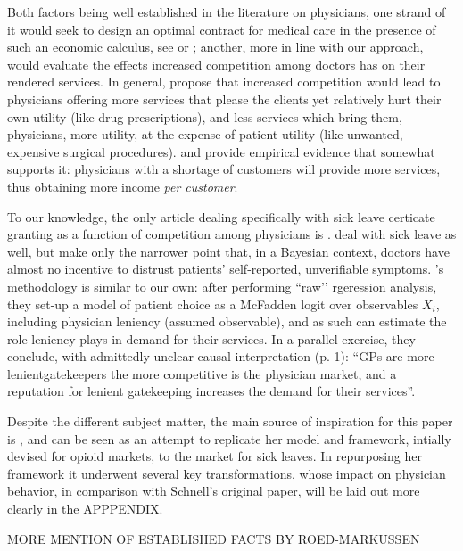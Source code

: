 \documentclass[../main.tex]{subfiles}
\begin{document}
Both factors being well established in the literature on physicians, one strand of it would seek to design an optimal contract for medical care in the presence of such an economic calculus, see \cite{chone-ma} or \cite{optimal-altruism}; another, more in line with our approach, would evaluate the effects increased competition among doctors has on their rendered services. In general, \cite{currie2023effects} propose that increased competition would lead to physicians offering more services that please the clients yet relatively hurt their own utility (like drug prescriptions), and less services which bring them, physicians, more utility, at the expense of patient utility (like unwanted, expensive surgical procedures). \cite{iversen-luras} and \cite{iversen2004} provide empirical evidence that somewhat supports it: physicians with a shortage of customers will provide more services, thus obtaining more income \textit{per customer}.

To our knowledge, the only article dealing specifically with sick leave certicate granting as a function of competition among physicians is \cite{markussen-roed}. \cite{cln} deal with sick leave as well, but make only the narrower point that, in a Bayesian context, doctors have almost no incentive to distrust patients’ self-reported, unverifiable symptoms. \citeauthor{markussen-roed}’s methodology is similar to our own: after performing ``raw'’ rgeression analysis, they set-up a model of patient choice as a McFadden logit over observables $X_i$, including physician leniency (assumed observable), and as such can estimate the role leniency plays in demand for their services. In a parallel exercise, they conclude, with admittedly unclear causal interpretation (p. 1): ``GPs are more lenientgatekeepers the more competitive is the physician market, and a reputation for lenient gatekeeping increases the demand for their services''.

Despite the different subject matter, the main source of inspiration for this paper is \cite{schnell2017physician}, and can be seen as an attempt to replicate her model and framework, intially devised for opioid markets, to the market for sick leaves. In repurposing her framework it underwent several key transformations, whose impact on physician behavior, in comparison with Schnell’s original paper, will be laid out more clearly in the APPPENDIX.

MORE MENTION OF ESTABLISHED FACTS BY ROED-MARKUSSEN
\end{document}
